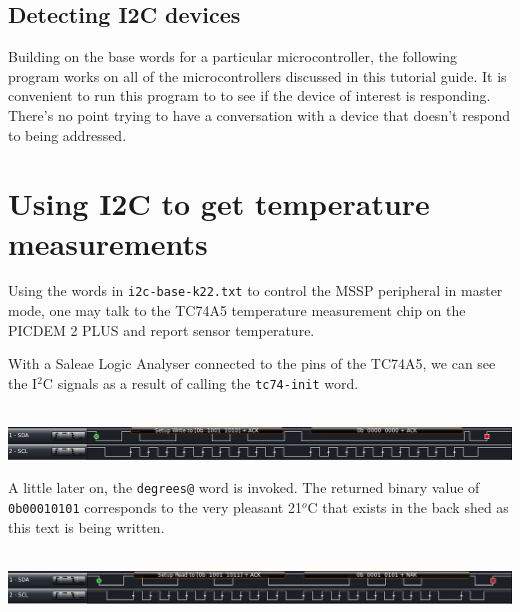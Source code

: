 \documentclass[12pt,a4paper]{article}
\newcommand{\code}[2]{
 \hrulefill
 \scriptsize
 
 \hrulefill
 \vspace{2em}
 \normalsize
}
\begin{document}
\newpage

\subsection{Detecting I2C devices}
%
Building on the base words for a particular microcontroller, the following program works on
all of the microcontrollers discussed in this tutorial guide.
It is convenient to run this program to to see if the device of interest is responding.
There's no point trying to have a conversation with a device that doesn't respond to being addressed.  

\bigskip\noindent
\code{}{../pic18/i2c-detect.txt}

\newpage

\section{Using I2C to get temperature measurements}
%
Using the words in \verb!i2c-base-k22.txt! to control the MSSP peripheral in master mode, 
one may talk to the TC74A5 temperature measurement chip on the PICDEM 2 PLUS
and report sensor temperature.

\bigskip\noindent
\code{}{../pic18/read-tc74-2016.txt}

\medskip\noindent
With a Saleae Logic Analyser connected to the pins of the TC74A5, we can see the I$^2$C 
signals as a result of calling the \verb!tc74-init! word.\\
\rule{0cm}{0.2cm}\\
\includegraphics[width=\textwidth]{../figs/saleae-logic-read-tc74-init-binary-region.png}

\medskip\noindent
A little later on, the \verb!degrees@! word is invoked.  
The returned binary value of \verb!0b00010101! corresponds 
to the very pleasant 21$^o$C that exists in the back shed as this text is being written.\\
\rule{0cm}{0.2cm}\\
\includegraphics[width=\textwidth]{../figs/saleae-logic-read-tc74-read-binary-region.png}


\newpage
\end{document}
